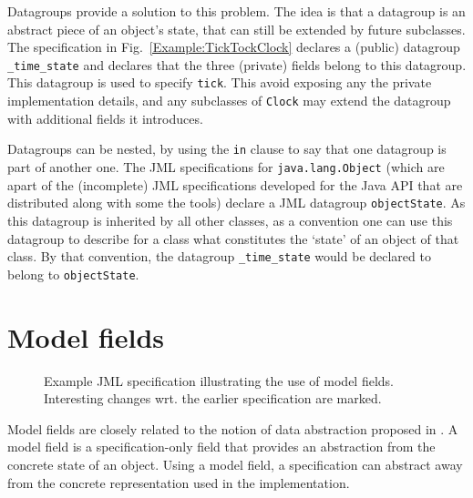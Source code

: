 \documentclass{llncs}
\begin{document}
Datagroups \cite{Leino98} provide a solution to 
this problem. The idea is that a datagroup is an abstract piece of an object's
state, that can still be extended by future subclasses.
The specification in Fig.~\ref{Example:TickTockClock} declares a (public) datagroup
\texttt{\_time\_state} and declares that the three (private) fields belong
to this datagroup. This datagroup is used to specify \texttt{tick}.
This avoid exposing any the private implementation details, and
any subclasses of \texttt{Clock} may extend the datagroup with
additional fields it introduces.

Datagroups can be nested, by using the \texttt{in} clause to say that
one datagroup is part of another one. The JML specifications for
\texttt{java.lang.Object} (which are apart of the (incomplete) JML 
specifications developed for the Java API that are distributed along with 
some the tools) declare a JML datagroup \texttt{objectState}. As this datagroup
is inherited by all other classes, as a convention one can use this datagroup 
to describe for a class what constitutes the `state' of an object of that class.
By that convention, the datagroup \texttt{\_time\_state} would be declared
to belong to \texttt{objectState}.

\section{Model fields}
\label{Sec:model}


\begin{figure}[tbp] \label{Example:model}
%

%
\vspace*{-2ex} %
\caption{Example JML specification illustrating the use of model fields. Interesting changes wrt. the earlier specification are marked.}
\end{figure}


Model fields are closely related to the notion of data abstraction proposed in 
\cite{Hoare72}.  A model field is a specification-only field that provides an 
abstraction from the concrete state of an object.  Using a model field, a 
specification can abstract away from the concrete representation used in 
the implementation.
\end{document}
